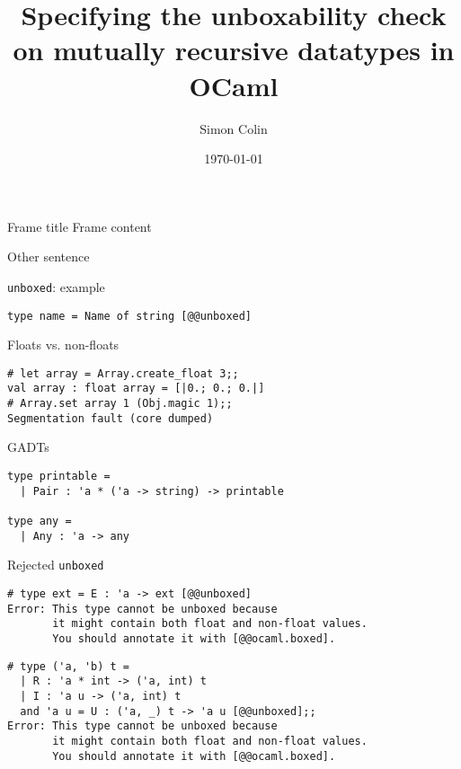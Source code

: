 \documentclass[svgnames]{beamer}
\title{Specifying the unboxability check on mutually recursive datatypes in OCaml}
\author{Simon Colin}
\date{\today}
\begin{document}
\begin{frame}
  \titlepage
\end{frame}

\begin{frame}{Frame title}
  Frame content

  \vfill

  Other sentence
\end{frame}

\begin{frame}[fragile]{\texttt{unboxed}: example}
\begin{lstlisting}
type name = Name of string [@@unboxed]
\end{lstlisting}
\end{frame}

\begin{frame}[fragile]{Floats vs. non-floats}
\begin{lstlisting}
# let array = Array.create_float 3;;
val array : float array = [|0.; 0.; 0.|]
# Array.set array 1 (Obj.magic 1);;
Segmentation fault (core dumped)
\end{lstlisting}
\end{frame}

\begin{frame}[fragile]{GADTs}
\begin{lstlisting}
type printable =
  | Pair : 'a * ('a -> string) -> printable

type any =
  | Any : 'a -> any
\end{lstlisting}
\end{frame}

\begin{frame}[fragile]{Rejected \texttt{unboxed}}
\begin{lstlisting}
# type ext = E : 'a -> ext [@@unboxed]
Error: This type cannot be unboxed because
       it might contain both float and non-float values.
       You should annotate it with [@@ocaml.boxed].
\end{lstlisting}
\end{frame}

\begin{frame}[fragile]
\begin{lstlisting}
# type ('a, 'b) t =
  | R : 'a * int -> ('a, int) t
  | I : 'a u -> ('a, int) t
  and 'a u = U : ('a, _) t -> 'a u [@@unboxed];;
Error: This type cannot be unboxed because
       it might contain both float and non-float values.
       You should annotate it with [@@ocaml.boxed].    
\end{lstlisting}
\end{frame}
\end{document}

